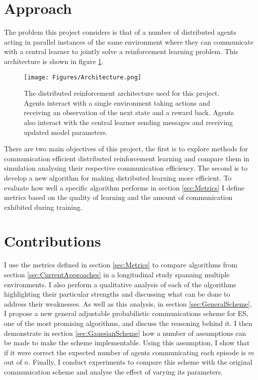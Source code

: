 \section{Approach}
The problem this project considers is that of a number of distributed agents acting in parallel instances of the same environment where they can communicate with a central learner to jointly solve a reinforcement learning problem. 
This architecture is shown in figure \ref{fig:Architecture}.
\begin{figure}
    \centering
    \texttt{[image: Figures/Architecture.png]}
    \caption{The distributed reinforcement architecture used for this project. Agents interact with a single environment taking actions and receiving an observation of the next state and a reward back. Agents also interact with the central learner sending messages and receiving updated model parameters.}
    \label{fig:Architecture}
\end{figure}
There are two main objectives of this project, the first is to explore methods for communication efficient distributed reinforcement learning and compare them in simulation analysing their respective communication efficiency. The second is to develop a new algorithm for making distributed learning more efficient.
To evaluate how well a specific algorithm performs in section \ref{sec:Metrics} I define metrics based on the quality of learning and the amount of communication exhibited during training.


\section{Contributions}

I use the metrics defined in section \ref{sec:Metrics} to compare algorithms from section \ref{sec:CurrentApproaches} in a longitudinal study spanning multiple environments. 
I also perform a qualitative analysis of each of the algorithms highlighting their particular strengths and discussing what can be done to address their weaknesses.
As well as this analysis, in section \ref{sec:GeneralScheme}, I propose a new general adjustable probabilistic communications scheme for ES, one of the most promising algorithms, and discuss the reasoning behind it. I then demonstrate in section \ref{sec:GaussianScheme} how a number of assumptions can be made to make the scheme implementable.
Using this assumption, I show that if it were correct the expected number of agents communicating each episode is $m$ out of $n$.
Finally, I conduct experiments to compare this scheme with the original communication scheme and analyse the effect of varying its parameters. 

